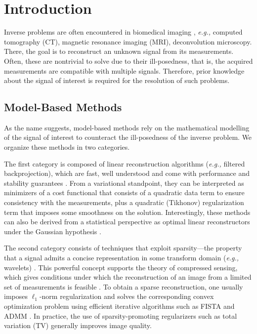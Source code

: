 \documentclass[journal]{IEEEtran}
\begin{document}
\section{Introduction}\label{sec:intro}
Inverse problems are often encountered in biomedical imaging \cite{unser2019biomedical}, \textit{e.g.,} computed tomography (CT), magnetic resonance imaging (MRI), deconvolution microscopy. There, the goal is to reconstruct an unknown signal from its measurements. Often, these are nontrivial to solve due to their ill-posedness, that is, the acquired measurements are compatible with multiple signals. Therefore, prior knowledge about the signal of interest is required for the resolution of such problems.   


\subsection{Model-Based Methods}
As the name suggests, model-based methods rely on the mathematical modelling of the signal of interest to counteract the ill-posedness of the inverse problem. We organize these methods in two categories. 

The first category is composed of linear reconstruction algorithms (\textit{e.g.,} filtered backprojection), which are fast, well understood and come with performance and stability guarantees \cite{tikhonov1963, bertero1998}. From a variational standpoint, they can be interpreted as minimizers of a cost functional that consists of a quadratic data term to ensure consistency with the measurements, plus a quadratic (Tikhonov) regularization term that imposes some smoothness on the solution. Interestingly, these methods can also be derived from a statistical perspective as optimal linear reconstructors under the Gaussian hypothesis \cite{kay1993fundamentals}. 

The second category consists of techniques that exploit sparsity---the property that a signal admits a concise representation in some transform domain (\textit{e.g.,} wavelets) \cite{mallat1999wavelet, bruckstein2009sparse,baraniuk2010applications,elad2010sparse}. This powerful concept supports the theory of compressed sensing, which gives conditions under which the reconstruction of an image from a limited set of measurements is feasible \cite{donoho2006compressed,candes2008introduction,foucart2013invitation}. To obtain a sparse reconstruction, one usually imposes $\ell_1$-norm regularization and solves the corresponding convex optimization problem using efficient iterative algorithms such as FISTA \cite{beck2009fast} and ADMM \cite{boyd2011distributed}. In practice, the use of sparsity-promoting regularizers such as total variation (TV) \cite{rudin1992nonlinear} generally improves image quality.
\end{document}
